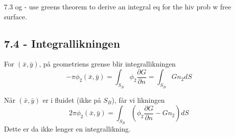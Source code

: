 7.3 og 
- use greens theorem to derive an integral eq for the hiv prob w free surface.

\subsection{7.4 - Integrallikningen}
For $(\bar{x},\bar{y})$, på geometriens grense blir integrallikningen
\begin{equation}
    -\pi \phi_2(\bar{x},\bar{y})  = \int_{S_B}  \phi_2  \frac{\partial G }{\partial n} = \int_{S_B}  G n_2 dS \tag{142}
\end{equation}

Når $(\bar{x},\bar{y})$ er i fluidet (ikke på $S_B$), får vi likningen
\begin{equation}
    2\pi \phi_2(\bar{x},\bar{y})  = \int_{S_B}  ( \phi_2  \frac{\partial G }{\partial n}-G n_2 )dS \tag{143}
\end{equation}
Dette er da ikke lenger en integrallikning.